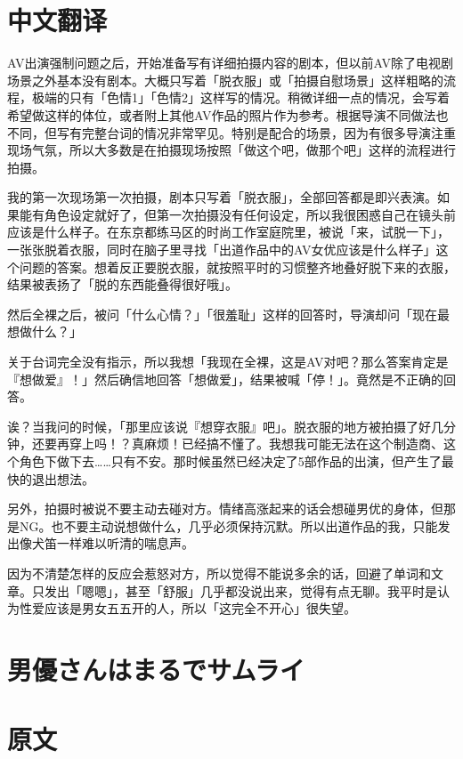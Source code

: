 \documentclass[12pt,UTF8]{ctexbook}
\begin{document}
\switchcolumn

\section*{中文翻译}

AV出演强制问题之后，开始准备写有详细拍摄内容的剧本，但以前AV除了电视剧场景之外基本没有剧本。大概只写着「脱衣服」或「拍摄自慰场景」这样粗略的流程，极端的只有「色情1」「色情2」这样写的情况。稍微详细一点的情况，会写着希望做这样的体位，或者附上其他AV作品的照片作为参考。根据导演不同做法也不同，但写有完整台词的情况非常罕见。特别是配合的场景，因为有很多导演注重现场气氛，所以大多数是在拍摄现场按照「做这个吧，做那个吧」这样的流程进行拍摄。

我的第一次现场第一次拍摄，剧本只写着「脱衣服」，全部回答都是即兴表演。如果能有角色设定就好了，但第一次拍摄没有任何设定，所以我很困惑自己在镜头前应该是什么样子。在东京都练马区的时尚工作室庭院里，被说「来，试脱一下」，一张张脱着衣服，同时在脑子里寻找「出道作品中的AV女优应该是什么样子」这个问题的答案。想着反正要脱衣服，就按照平时的习惯整齐地叠好脱下来的衣服，结果被表扬了「脱的东西能叠得很好哦」。

然后全裸之后，被问「什么心情？」「很羞耻」这样的回答时，导演却问「现在最想做什么？」

关于台词完全没有指示，所以我想「我现在全裸，这是AV对吧？那么答案肯定是『想做爱』！」然后确信地回答「想做爱」，结果被喊「停！」。竟然是不正确的回答。

诶？当我问的时候，「那里应该说『想穿衣服』吧」。脱衣服的地方被拍摄了好几分钟，还要再穿上吗！？真麻烦！已经搞不懂了。我想我可能无法在这个制造商、这个角色下做下去……只有不安。那时候虽然已经决定了5部作品的出演，但产生了最快的退出想法。

另外，拍摄时被说不要主动去碰对方。情绪高涨起来的话会想碰男优的身体，但那是NG。也不要主动说想做什么，几乎必须保持沉默。所以出道作品的我，只能发出像犬笛一样难以听清的喘息声。

因为不清楚怎样的反应会惹怒对方，所以觉得不能说多余的话，回避了单词和文章。只发出「嗯嗯」，甚至「舒服」几乎都没说出来，觉得有点无聊。我平时是认为性爱应该是男女五五开的人，所以「这完全不开心」很失望。

\switchcolumn

\section{男優さんはまるでサムライ}

\switchcolumn

\section*{原文}
\end{document}
